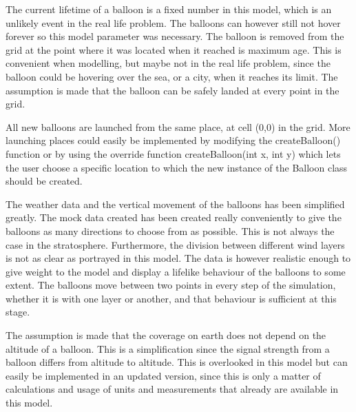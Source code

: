 The current lifetime of a balloon is a fixed number in this model, which is an unlikely event in the real life problem. The balloons can however still not hover forever so this model parameter was necessary. The balloon is removed from the grid at the point where it was located when it reached is maximum age. This is convenient when modelling, but maybe not in the real life problem, since the balloon could be hovering over the sea, or a city, when it reaches its limit. The assumption is made that the balloon can be safely landed at every point in the grid. 

All new balloons are launched from the same place, at cell (0,0) in the grid. More launching places could easily be implemented by modifying the createBalloon() function or by using the override function createBalloon(int x, int y) which lets the user choose a specific location to which the new instance of the Balloon class should be created.

The weather data and the vertical movement of the balloons has been simplified greatly. The mock data created has been created really conveniently to give the balloons as many directions to choose from as possible. This is not always the case in the stratosphere. Furthermore, the division between different wind layers is not as clear as portrayed in this model. The data is however realistic enough to give weight to the model and display a lifelike behaviour of the balloons to some extent. The balloons move between two points in every step of the simulation, whether it is with one layer or another, and that behaviour is sufficient at this stage.

The assumption is made that the coverage on earth does not depend on the altitude of a balloon. This is a simplification since the signal strength from a balloon differs from altitude to altitude. This is overlooked in this model but can easily be implemented in an updated version, since this is only a matter of calculations and usage of units and measurements that already are available in this model. 


